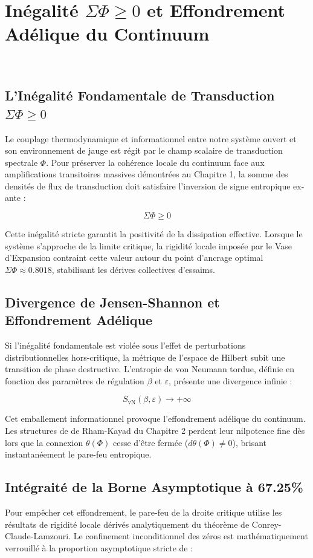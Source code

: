 \chapter{In{\'e}galit{\'e} \(\Sigma\Phi \ge 0\) et Effondrement Ad{\'e}lique du Continuum}
\(\label{ch:adelic_collapse}\)

\section{L'In{\'e}galit{\'e} Fondamentale de Transduction \(\Sigma\Phi \ge 0\)}
Le couplage thermodynamique et informationnel entre notre syst{\`e}me ouvert et son environnement de jauge est r{\'e}git par le champ scalaire de transduction spectrale \(\Phi\). Pour pr{\'e}server la coh{\'e}rence locale du continuum face aux amplifications transitoires massives d{\'e}montr{\'e}es au Chapitre 1, la somme des densit{\'e}s de flux de transduction doit satisfaire l'inversion de signe entropique ex-ante :

\[\Sigma\Phi \ge 0\]

Cette in{\'e}galit{\'e} stricte garantit la positivit{\'e} de la dissipation effective. Lorsque le syst{\`e}me s'approche de la limite critique, la rigidit{\'e} locale impos{\'e}e par le Vase d'Expansion contraint cette valeur autour du point d'ancrage optimal \(\Sigma\Phi \approx 0.8018\), stabilisant les d{\'e}rives collectives d'essaims.

\section{Divergence de Jensen-Shannon et Effondrement Ad{\'e}lique}
Si l'in{\'e}galit{\'e} fondamentale est viol{\'e}e sous l'effet de perturbations distributionnelles hors-critique, la m{\'e}trique de l'espace de Hilbert subit une transition de phase destructive. L'entropie de von Neumann tordue, d{\'e}finie en fonction des param{\`e}tres de r{\'e}gulation \(\beta\) et \(\varepsilon\), pr{\'e}sente une divergence infinie :

\[S_{\text{vN}}(\beta, \varepsilon) \to +\infty\]

Cet emballement informationnel provoque l'effondrement ad{\'e}lique du continuum. Les structures de de Rham-Kayad du Chapitre 2 perdent leur nilpotence fine d{\`e}s lors que la connexion \(\theta(\Phi)\) cesse d'{\^e}tre ferm{\'e}e (\(d\theta(\Phi) \neq 0\)), brisant instantan{\'e}ement le pare-feu entropique.

\section{Int{\'e}grait{\'e} de la Borne Asymptotique {\`a} 67.25\%}
Pour emp{\^e}cher cet effondrement, le pare-feu de la droite critique utilise les r{\'e}sultats de rigidit{\'e} locale d{\'e}riv{\'e}s analytiquement du th{\'e}or{\`e}me de Conrey-Claude-Lamzouri. Le confinement inconditionnel des zéros est math{\'e}matiquement verrouill{\'e} {\`a} la proportion asymptotique stricte de :

